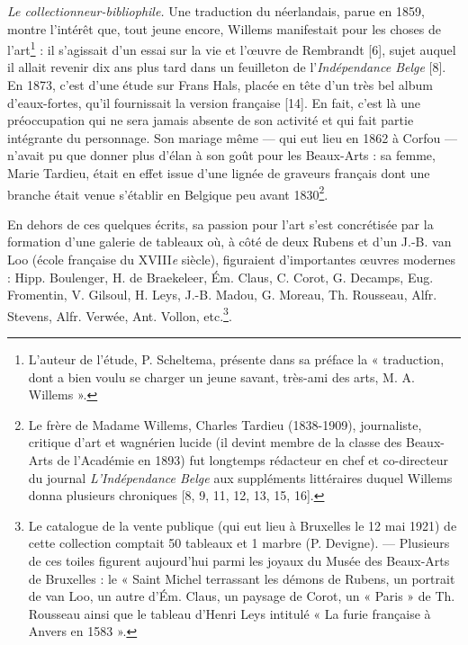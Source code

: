 \documentclass{book}%
\newcommand{\italique}[1]{\textit{#1}}%
\newcommand{\nieme}[1]{#1\italique{e}}%
\newcommand{\note}[1]{\footnote{#1}}
\begin{document}
\italique{Le collectionneur-bibliophile.} Une traduction du néerlandais, parue en 1859, montre l'intérêt que, tout jeune encore, Willems manifestait pour les choses de l'art\note{L'auteur de l'étude, P. Scheltema, présente dans sa préface la « traduction, dont a bien voulu se charger un jeune savant, très-ami des arts, M. A. Willems ».} : il s'agissait d'un essai sur la vie et l'œuvre de Rembrandt [6], sujet auquel il allait revenir dix ans plus tard dans un feuilleton de l'\italique{Indépendance Belge} [8]. 
En 1873, c'est d'une étude sur Frans Hals, placée en tête d'un très bel album d'eaux-fortes, qu'il fournissait la version française [14].
En fait, c'est là une préoccupation qui ne sera jamais absente de son activité et qui fait partie intégrante du personnage.
Son mariage même — qui eut lieu en 1862 à Corfou — n'avait pu que donner plus d'élan à son goût pour les Beaux-Arts : sa femme, Marie Tardieu, était en effet issue d'une lignée de graveurs français dont une branche était venue s'établir en Belgique peu avant 1830\note{Le frère de Madame Willems, Charles Tardieu (1838-1909), journaliste, critique d'art et wagnérien lucide (il devint membre de la classe des Beaux-Arts de l'Académie en 1893) fut longtemps rédacteur en chef et co-directeur du journal \italique{L'Indépendance Belge} aux suppléments littéraires duquel Willems donna plusieurs chroniques [8, 9, 11, 12, 13, 15, 16].}. 

En dehors de ces quelques écrits, sa passion pour l'art s'est concrétisée par la formation d'une galerie de tableaux où, à côté de deux Rubens et d'un J.-B. van Loo (école française du \nieme{XVIII} siècle), figuraient d'importantes œuvres modernes : Hipp. Boulenger, H. de Braekeleer, Ém. Claus, C. Corot, G. Decamps, Eug. Fromentin, V. Gilsoul, H. Leys, J.-B. Madou, G. Moreau, Th. Rousseau, Alfr. Stevens, Alfr. Verwée, Ant. Vollon, etc.\note{Le catalogue de la vente publique (qui eut lieu à Bruxelles le 12 mai 1921) de cette collection comptait 50 tableaux et 1 marbre (P. Devigne). — Plusieurs de ces toiles figurent aujourd'hui parmi les joyaux du Musée des Beaux-Arts de Bruxelles : le « Saint Michel terrassant les démons de Rubens, un portrait de van Loo, un autre d'Ém. Claus, un paysage de Corot, un « Paris » de Th. Rousseau ainsi que le tableau d'Henri Leys intitulé « La furie française à Anvers en 1583 ».}.
\end{document}
